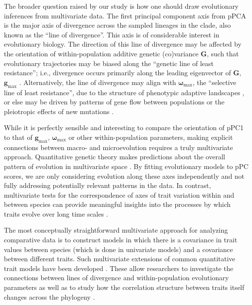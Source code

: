 \documentclass[a4paper,11pt]{article}
\begin{document}
The broader question raised by our study is how one should draw evolutionary inferences from multivariate data. The first principal component axis from pPCA is the major axis of divergence across the sampled lineages in the clade, also known as the ``line of divergence''. This axis is of considerable interest in evolutionary biology. The direction of this line of divergence may be affected by the orientation of within-population additive genetic (co)variance $\mathbf{G}$, such that evolutionary trajectories may be biased along the ``genetic line of least resistance''; i.e., divergence occurs primarily along the leading eigenvector of $\mathbf{G}$, $\mathbf{g}_{\text{max}}$ \citep{Schluter1996}. Alternatively, the line of divergence may align with $\boldsymbol{\omega}_{\text{max}}$, the  ``selective line of least resistance'', due to the structure of phenotypic adaptive landscapes \citep{Arnoldetal2001, Jonesetal2007, Arnoldetal2008}, or else may be driven by patterns of gene flow between populations \citep{Guillaume2007} or the pleiotropic effects of new mutations \citep{Jonesetal2007, Hether2013}. 

While it is perfectly sensible and interesting to compare the orientation of pPC1 to that of $\mathbf{g}_{\text{max}}$, $\boldsymbol{\omega}_{\text{max}}$ or other within-population parameters, making explicit connections between macro- and microevolution requires a truly multivariate approach. Quantitative genetic theory makes predictions about the overall pattern of evolution in multivariate space \citep{Lande1979}. By fitting evolutionary models to pPC scores, we are only considering evolution along these axes independently and not fully addressing potentially relevant patterns in the data. In contrast, multivariate tests for the correspondence of axes of trait variation within and between species can provide meaningful insights into the processes by which traits evolve over long time scales \citep{Hohenlohe2008, Bolstad2014}.

The most conceptually straightforward multivariate approach for analyzing comparative data is to construct models in which there is a covariance in trait values between species (which is done in univariate models) and a covariance between different traits. Such multivariate extensions of common quantitative trait models have been developed \citep{ButlerKing2004, RevellHarmon2008, Hohenlohe2008, RevellCollar2009, motmot}. These allow researchers to investigate the connections between lines of divergence and within-population evolutionary parameters \citep{Hohenlohe2008} as well as to study how the correlation structure between traits itself changes across the phylogeny \citep{RevellCollar2009}. 
\end{document}
